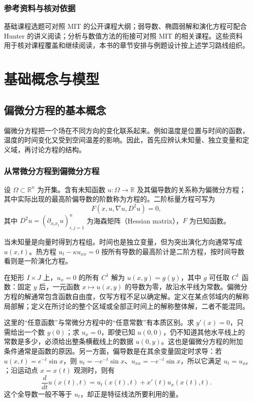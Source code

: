 \documentclass[UTF8,12pt,a4paper,fontset=fandol]{ctexbook}
\begin{document}
\section{参考资料与核对依据}

基础课程选题可对照 MIT 的公开课程大纲\cite{mit152}；弱导数、椭圆弱解和演化方程可配合 Hunter 的讲义\cite{hunter}阅读；分析与数值方法的衔接可对照 MIT 的相关课程\cite{mit303}。这些资料用于核对课程覆盖和继续阅读，本书的章节安排与例题设计按上述学习路线组织。

\mainmatter

\part{基础概念与模型}

\chapter{偏微分方程的基本概念}
\label{chap:concepts}

偏微分方程把一个场在不同方向的变化联系起来。例如温度是位置与时间的函数，温度的时间变化又受到空间温差的影响。因此，首先应辨认未知量、独立变量和定义域，再讨论方程的结构。

\section{从常微分方程到偏微分方程}
\begin{definition}
设 $\Omega\subset\mathbb R^n$ 为开集。含有未知函数 $u:\Omega\to\mathbb R$ 及其偏导数的关系称为偏微分方程；其中实际出现的最高阶偏导数的阶数称为方程的。二阶标量方程可写为
\[
 F(x,u,\nabla u,D^2u)=0,
\]
其中 $D^2u=(\partial_{x_i x_j}u)_{i,j=1}^n$ 为海森矩阵（Hessian matrix），$F$ 为已知函数。
\end{definition}
当未知量是向量时得到方程组。时间也是独立变量，但为突出演化方向通常写成 $u(x,t)$。热方程 $u_t-\kappa u_{xx}=0$ 按所有导数的最高阶计是二阶方程，按时间导数看则是一阶演化方程。

在矩形 $I\times J$ 上，$u_x=0$ 的所有 $C^1$ 解为 $u(x,y)=g(y)$，其中 $g$ 可任取 $C^1$ 函数：固定 $y$ 后，一元函数 $x\mapsto u(x,y)$ 的导数为零，故沿水平线为常数。偏微分方程的解通常包含函数自由度，仅写方程不足以确定解。定义在某点邻域内的解称局部解；定义在所讨论的整个区域或全部正时间上的解称整体解，二者不能混同。

这里的“任意函数”与常微分方程中的“任意常数”有本质区别。求 $y'(x)=0$，只需给出一个数 $y(0)$；求 $u_x=0$，即使已知 $u(0,0)$，仍不知道其他水平线上的常数是多少，必须给出整条横截线上的数据 $u(0,y)$。这也是偏微分方程的附加条件通常是函数的原因。另一方面，偏导数是在其余变量固定时求导：若 $u(x,t)=e^{-t}\sin x$，则 $u_t=-e^{-t}\sin x$、$u_{xx}=-e^{-t}\sin x$，所以它满足 $u_t=u_{xx}$；沿运动点 $x=x(t)$ 观测时，则有
\[
 \frac d{dt}u(x(t),t)=u_t(x(t),t)+x'(t)u_x(x(t),t).
\]
这个全导数一般不等于 $u_t$，却正是特征线法所要利用的量。
\end{document}
